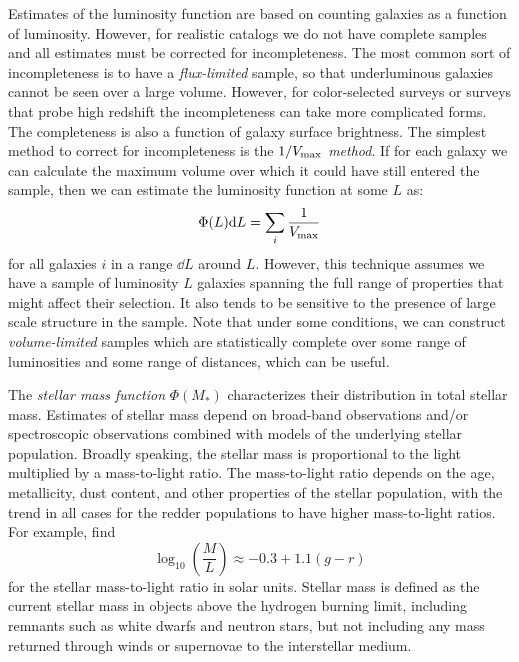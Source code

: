 Estimates of the luminosity function are based on counting galaxies as
a function of luminosity. However, for realistic catalogs we do not
have complete samples and all estimates must be corrected for
incompleteness. The most common sort of incompleteness is to have a
{\it flux-limited} sample, so that underluminous galaxies cannot be
seen over a large volume. However, for color-selected surveys or
surveys that probe high redshift the incompleteness can take more
complicated forms. The completeness is also a function of galaxy
surface brightness. The simplest method to correct for incompleteness
is the {\it $1/V_{\rm max}$ method}. If for each galaxy we can
calculate the maximum volume over which it could have still entered
the sample, then we can estimate the luminosity function at some $L$
as:
\begin{equation}
\Phi(L) {\rm d}L = \sum_i \frac{1}{V_{\rm max}}
\end{equation}
for all galaxies $i$ in a range $\dd{L}$ around $L$. However, this
technique assumes we have a sample of luminosity $L$ galaxies spanning
the full range of properties that might affect their selection. It
also tends to be sensitive to the presence of large scale structure in
the sample. Note that under some conditions, we can construct {\it
volume-limited} samples which are statistically complete over some
range of luminosities and some range of distances, which can be
useful.

The {\it stellar mass function} $\Phi(M_\ast)$ characterizes their
distribution in total stellar mass. Estimates of stellar mass depend
on broad-band observations and/or spectroscopic observations combined
with models of the underlying stellar population. Broadly speaking,
the stellar mass is proportional to the light multiplied by a
mass-to-light ratio. The mass-to-light ratio depends on the age,
metallicity, dust content, and other properties of the stellar
population, with the trend in all cases for the redder populations to
have higher mass-to-light ratios. For example, \citet{bell00a} find
\begin{equation}
\label{eq:belldejong}
\log_{10} \left(\frac{M}{L}\right) \approx -0.3 + 1.1 (g-r)
\end{equation}
for the stellar mass-to-light ratio in solar units. Stellar mass is
defined as the current stellar mass in objects above the hydrogen
burning limit, including remnants such as white dwarfs and neutron
stars, but not including any mass returned through winds or supernovae
to the interstellar medium.


